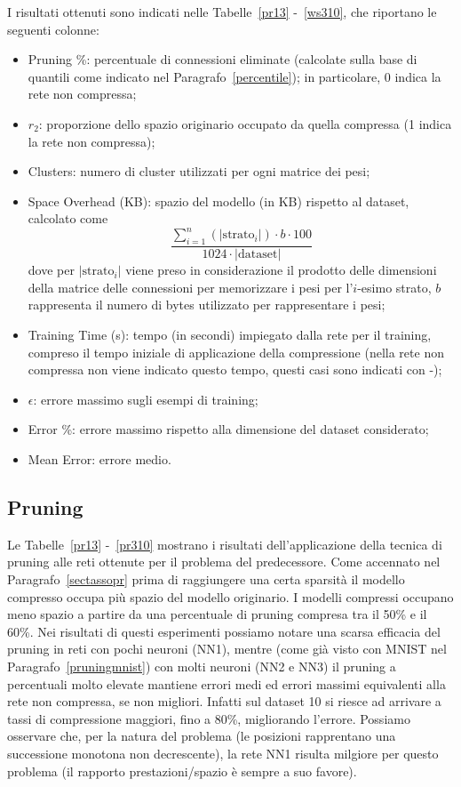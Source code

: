 \documentclass[11pt,a4paper,twoside,
openright]{book}
\begin{document}
I risultati ottenuti sono indicati nelle Tabelle~\ref{pr13} -~\ref{ws310}, che riportano le seguenti colonne:
\begin{itemize}
\item Pruning \%: percentuale di connessioni eliminate (calcolate sulla base di quantili come indicato nel Paragrafo~\ref{percentile}); in particolare, 0 indica la rete non compressa;
\item $r_2$: proporzione dello spazio originario occupato da quella compressa (1 indica la rete non compressa);
\item Clusters: numero di cluster utilizzati per ogni matrice dei pesi;
\item Space Overhead (KB):  spazio del modello (in KB) rispetto al dataset, calcolato come $$\displaystyle{\frac{\sum\limits_{i=1}^n \left(|\mathrm{strato}_i|\right) \cdot b \cdot 100}{1024 \cdot \left| \mathrm{dataset} \right|}}$$ dove per $|\mathrm{strato}_i|$ viene preso in considerazione il prodotto delle dimensioni della matrice delle connessioni per memorizzare i pesi per l'$i$-esimo strato, $b$ rappresenta il numero di bytes utilizzato per rappresentare i pesi;
\item Training Time (s): tempo (in secondi) impiegato dalla rete per il training, compreso il tempo iniziale di applicazione della compressione (nella rete non compressa non viene indicato questo tempo, questi casi sono indicati con -);
\item $\epsilon$: errore massimo sugli esempi di training;
\item Error \%: errore massimo rispetto alla dimensione del dataset considerato;
\item Mean Error: errore medio.
\end{itemize}

\subsection{Pruning}
\label{prpred}
Le Tabelle~\ref{pr13} -~\ref{pr310} mostrano i risultati dell'applicazione della tecnica di pruning alle reti ottenute per il problema del predecessore. Come accennato nel Paragrafo~\ref{sectassopr} prima di raggiungere una certa sparsità il modello compresso occupa più spazio del modello originario. I modelli compressi occupano meno spazio a partire da una percentuale di pruning compresa tra il 50\% e il 60\%.
Nei risultati di questi esperimenti possiamo notare una scarsa efficacia del pruning in reti con pochi neuroni (NN1), mentre (come già visto con MNIST nel Paragrafo~\ref{pruningmnist}) con molti neuroni (NN2 e NN3) il pruning a percentuali molto elevate mantiene errori medi ed errori massimi equivalenti alla rete non compressa, se non migliori. 
Infatti sul dataset 10 si riesce ad arrivare a tassi di compressione maggiori, fino a 80\%, migliorando l'errore. Possiamo osservare che, per la natura del problema (le posizioni rapprentano una successione monotona non decrescente), la rete NN1 risulta milgiore per questo problema (il rapporto prestazioni/spazio è sempre a suo favore).

\end{document}
